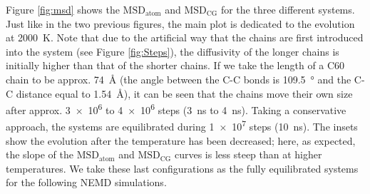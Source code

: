 \documentclass[aps,prb,reprint,superscriptaddress, a4paper]{revtex4-1}
\begin{document}
Figure \ref{fig:msd} shows the  $\text{MSD}_{\text{atom}}$ and $\text{MSD}_{\text{CG}}$ for the three different systems. Just like in the two previous figures, the main plot is dedicated to the evolution at  \SI{2000}{\kelvin}. Note that due to the artificial way that the chains are first introduced into the system (see Figure \ref{fig:Steps}), the diffusivity of the longer chains is initially higher than that of the shorter chains.  If we take the length of a C60 chain to be approx. \SI{74}{\angstrom} (the angle between the C-C bonds is \SI{109.5}{\degree} and the C-C distance equal to \SI{1.54}{\angstrom}),  it can be seen that the chains move their own size after approx. \SI{3e6}{} to  \SI{4e6}{} steps (\SI{3}{\nano\second} to \SI{4}{\nano\second}). Taking a conservative approach, the systems are equilibrated during  \SI{1e7}{} steps (\SI{10}{\nano\second}). The insets show the evolution after the temperature has been decreased; here, as expected, the slope of the $\text{MSD}_{\text{atom}}$ and $\text{MSD}_{\text{CG}}$ curves is less steep than at higher temperatures. We take these last configurations as the fully equilibrated systems for the following NEMD simulations.
\end{document}
